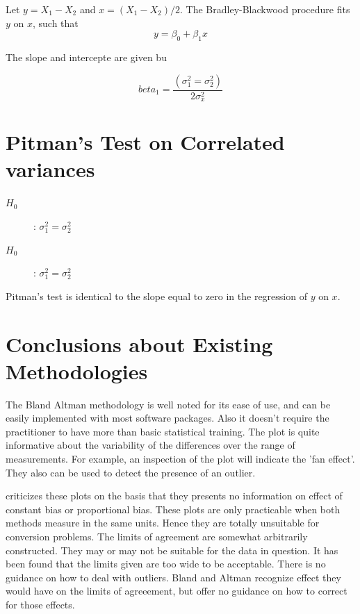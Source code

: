 \documentclass[12pt, a4paper]{report}
\theoremstyle{plain}
\theoremstyle{definition}
\theoremstyle{remark}
\begin{document}
Let $y = X_1 - X_2$ and $x= (X_1 - X_2)/2$.
The Bradley-Blackwood procedure fits $y$ on $x$, such that
\[ y = \beta_0 + \beta_1x \]

The slope and intercepte are given bu

\[beta_1 =  \frac{(\sigma^2_1 = \sigma^2_2)}{2\sigma^2_x}\]


\section*{Pitman's Test on Correlated variances}
\begin{description}
	\item[$H_0$] : $\sigma^2_1 = \sigma^2_2$
	\item[$H_0$] : $\sigma^2_1 = \sigma^2_2$
\end{description}


Pitman's test is identical to the slope equal to zero in the regression of $y$ on $x$.




\section{Conclusions about Existing Methodologies}

The Bland Altman methodology is well noted for its ease of use,
and can be easily implemented with most software packages. Also it
doesn't require the practitioner to have more than basic
statistical training. The plot is quite informative about the
variability of the differences over the range of measurements. For
example, an inspection of the plot will indicate the 'fan effect'.
They also can be used to detect the presence of an outlier.

\citet{ludbrook97,ludbrook02} criticizes these plots on the
basis that they presents no information on effect of constant bias
or proportional bias. These plots are only practicable when both
methods measure in the same units. Hence they are totally
unsuitable for conversion problems. The limits of agreement are
somewhat arbitrarily constructed. They may or may not be suitable
for the data in question. It has been found that the limits given
are too wide to be acceptable. There is no guidance on how to deal
with outliers. Bland and Altman recognize effect they would have
on the limits of agreeement, but offer no guidance on how to
correct for those effects.
\end{document}

